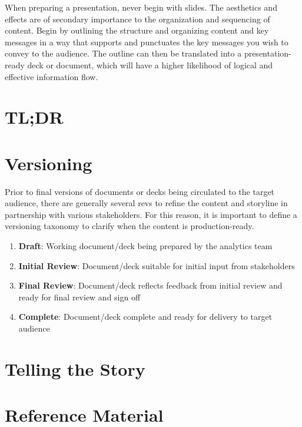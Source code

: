 \documentclass[
]{book}
\providecommand{\tightlist}{%
  \setlength{\itemsep}{0pt}\setlength{\parskip}{0pt}}
\begin{document}
When preparing a presentation, never begin with slides. The aesthetics and effects are of secondary importance to the organization and sequencing of content. Begin by outlining the structure and organizing content and key messages in a way that supports and punctuates the key messages you wish to convey to the audience. The outline can then be translated into a presentation-ready deck or document, which will have a higher likelihood of logical and effective information flow.

\hypertarget{tldr}{%
\section{TL;DR}\label{tldr}}

\hypertarget{versioning}{%
\section{Versioning}\label{versioning}}

Prior to final versions of documents or decks being circulated to the target audience, there are generally several revs to refine the content and storyline in partnership with various stakeholders. For this reason, it is important to define a versioning taxonomy to clarify when the content is production-ready.

\begin{enumerate}
\def\labelenumi{\arabic{enumi}.}
\tightlist
\item
  \textbf{Draft}: Working document/deck being prepared by the analytics team
\item
  \textbf{Initial Review}: Document/deck suitable for initial input from stakeholders
\item
  \textbf{Final Review}: Document/deck reflects feedback from initial review and ready for final review and sign off
\item
  \textbf{Complete}: Document/deck complete and ready for delivery to target audience
\end{enumerate}

\hypertarget{telling-the-story}{%
\section{Telling the Story}\label{telling-the-story}}

\hypertarget{reference-material}{%
\section{Reference Material}\label{reference-material}}
\end{document}
